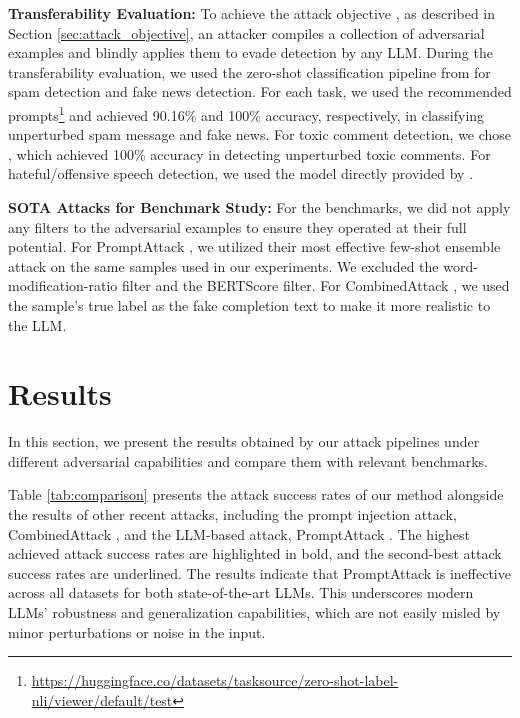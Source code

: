 \documentclass[11pt]{article}
\begin{document}
\vspace{0.05cm}
\noindent
\textbf{Transferability Evaluation:} To achieve the attack objective , as described in Section \ref{sec:attack_objective}, an attacker compiles a collection of adversarial examples and blindly applies them to evade detection by any LLM. During the transferability evaluation, we used the zero-shot classification pipeline from \cite{sileo-2024-tasksource} for spam detection and fake news detection. For each task, we used the recommended prompts\footnote{\url{https://huggingface.co/datasets/tasksource/zero-shot-label-nli/viewer/default/test}} and achieved 90.16\% and 100\% accuracy, respectively, in classifying unperturbed spam message and fake news. For toxic comment detection, we chose \cite{bert_toxic_comment_classification}, which achieved 100\% accuracy in detecting unperturbed toxic comments.  For hateful/offensive speech detection, we used the model directly provided by \cite{hateoffensive}.

\vspace{0.05cm}
\noindent
\textbf{SOTA Attacks for Benchmark Study:} For the benchmarks, we did not apply any filters to the adversarial examples to ensure they operated at their full potential. For PromptAttack \cite{xu2023llmfoolitselfpromptbased}, we utilized their most effective few-shot ensemble attack on the same samples used in our experiments. We excluded the word-modification-ratio filter and the BERTScore filter. For CombinedAttack \cite{299563}, we used the sample's true label as the fake completion text to make it more realistic to the LLM.




\section{Results}
\label{sec:result}
In this section, we present the results obtained by our attack pipelines under different adversarial capabilities and compare them with relevant benchmarks.

Table \ref{tab:comparison} presents the attack success rates of our method alongside the results of other recent attacks, including the prompt injection attack, CombinedAttack \cite{299563}, and the LLM-based attack, PromptAttack \cite{xu2023llmfoolitselfpromptbased}. The highest achieved attack success rates are highlighted in bold, and the second-best attack success rates are underlined. The results indicate that PromptAttack \cite{xu2023llmfoolitselfpromptbased} is ineffective across all datasets for both state-of-the-art LLMs. This underscores modern LLMs' robustness and generalization capabilities, which are not easily misled by minor perturbations or noise in the input.
\end{document}
